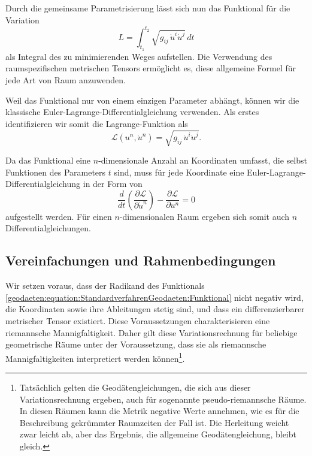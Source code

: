 Durch die gemeinsame Parametrisierung lässt sich nun das Funktional für die Variation
\begin{equation}
	L = \int_{t_1}^{t_2} \sqrt{g_{i\!j} \, \dot{u}^i \dot{u}^j} \, dt
	\label{geodaeten:equation:StandardverfahrenGeodaeten:Funktional}
\end{equation}
als Integral des zu minimierenden Weges aufstellen.
Die Verwendung des raumspezifischen metrischen Tensors ermöglicht es, diese allgemeine Formel für jede Art von Raum anzuwenden.

Weil das Funktional nur von einem einzigen Parameter abhängt, können wir die klassische Euler-Lagrange-Differentialgleichung verwenden.
Als erstes identifizieren wir somit die Lagrange-Funktion als
\begin{equation}
	\mathcal{L}(u^n, \dot{u}^n) = \sqrt{g_{i\!j} \, \dot{u}^i \dot{u}^j}.
	\label{geodaeten:equation:StandardverfahrenGeodaeten:LagrangeFunktion}
\end{equation}

Da das Funktional eine $n$-dimensionale Anzahl an Koordinaten
umfasst, die selbst Funktionen des Parameters $t$ sind, muss für
jede Koordinate eine Euler-Lagrange-Diffe\-ren\-tial\-glei\-chung in der
Form von
\begin{equation}
	\frac{d}{dt} \left(\frac{\partial \mathcal{L}}{\partial \dot{u}^n}\right) - \frac{\partial \mathcal{L}}{\partial u^n} = 0
	\label{geodaeten:equation:StandardverfahrenGeodaeten:DGL1}
\end{equation}
aufgestellt werden.
Für einen $n$-dimensionalen Raum ergeben sich somit auch $n$ Differentialgleichungen. 

\subsection{Vereinfachungen und Rahmenbedingungen}
Wir setzen voraus, dass der Radikand des Funktionals \eqref{geodaeten:equation:StandardverfahrenGeodaeten:Funktional} nicht negativ wird, die Koordinaten sowie ihre Ableitungen stetig sind, und dass ein differenzierbarer metrischer Tensor existiert. 
Diese Voraussetzungen charakterisieren eine riemannsche Mannigfaltigkeit.
Daher gilt diese Variationsrechnung für beliebige geometrische Räume unter der Voraussetzung, dass sie als riemannsche Mannigfaltigkeiten interpretiert werden können\footnote{Tatsächlich gelten die Geodätengleichungen, die sich aus dieser Variationsrechnung ergeben, auch für sogenannte pseudo-riemannsche Räume.
	In diesen Räumen kann die Metrik negative Werte annehmen, wie es für die Beschreibung gekrümmter Raumzeiten der Fall ist.
	Die Herleitung weicht zwar leicht ab, aber das Ergebnis, die allgemeine Geodätengleichung, bleibt gleich.
}.

